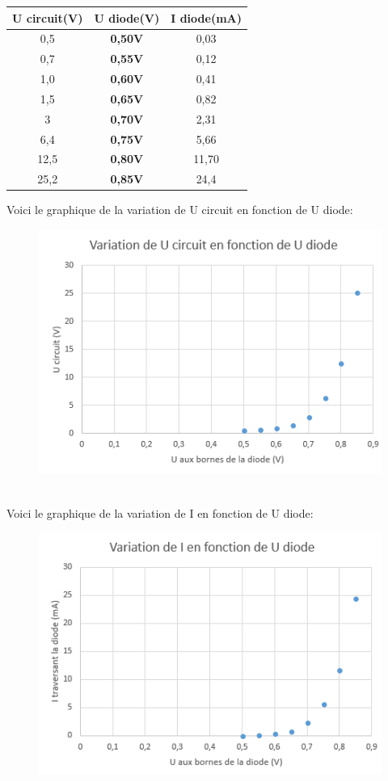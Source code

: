 \documentclass{report}
\begin{document}
\begin{tabular}{|c|c|c|}
\hline
\textbf{U circuit(V)} & \textbf{U diode(V)} & \textbf{I  diode(mA)} \\
\hline
0,5 & \textbf{0,50V} & 0,03  \\
\hline
0,7 & \textbf{0,55V} & 0,12 \\
\hline
1,0 & \textbf{0,60V} & 0,41 \\
\hline
1,5 & \textbf{0,65V} & 0,82 \\
\hline
3 & \textbf{0,70V} & 2,31 \\
\hline
6,4 & \textbf{0,75V} & 5,66 \\
\hline
12,5 & \textbf{0,80V} & 11,70  \\
\hline
25,2 & \textbf{0,85V} & 24,4\\
\hline
\end{tabular}
\newpage
Voici le graphique de la variation de U circuit en fonction de U diode:
\begin{figure}[h!]
\centering
\includegraphics[scale=0.75]{UU.png}
\end{figure}
\\
Voici le graphique de la variation de I en fonction de U diode:
\begin{figure}[h!]
\centering
\includegraphics[scale=0.75]{UI.png}
\end{figure}
\end{document}

